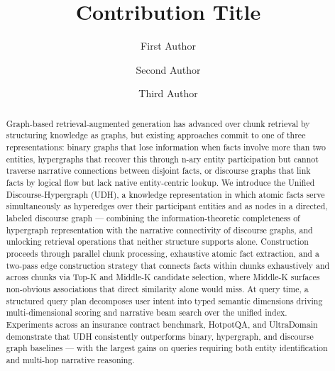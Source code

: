 \documentclass[runningheads]{llncs}
\begin{document}
%
\title{Contribution Title}
%
%
\author{First Author \and
Second Author \and
Third Author}
%
%
%
\maketitle              %
%
\begin{abstract}
Graph-based retrieval-augmented generation has advanced over chunk retrieval by structuring knowledge as graphs, but existing approaches commit to one of three representations: binary graphs that lose information when facts involve more than two entities, hypergraphs that recover this through n-ary entity participation but cannot traverse narrative connections between disjoint facts, or discourse graphs that link facts by logical flow but lack native entity-centric lookup. We introduce the Unified Discourse-Hypergraph (UDH), a knowledge representation in which atomic facts serve simultaneously as hyperedges over their participant entities and as nodes in a directed, labeled discourse graph — combining the information-theoretic completeness of hypergraph representation with the narrative connectivity of discourse graphs, and unlocking retrieval operations that neither structure supports alone. Construction proceeds through parallel chunk processing, exhaustive atomic fact extraction, and a two-pass edge construction strategy that connects facts within chunks exhaustively and across chunks via Top-K and Middle-K candidate selection, where Middle-K surfaces non-obvious associations that direct similarity alone would miss. At query time, a structured query plan decomposes user intent into typed semantic dimensions driving multi-dimensional scoring and narrative beam search over the unified index. Experiments across an insurance contract benchmark, HotpotQA, and UltraDomain demonstrate that UDH consistently outperforms binary, hypergraph, and discourse graph baselines — with the largest gains on queries requiring both entity identification and multi-hop narrative reasoning.

\end{abstract}
%
%
%
\end{document}
